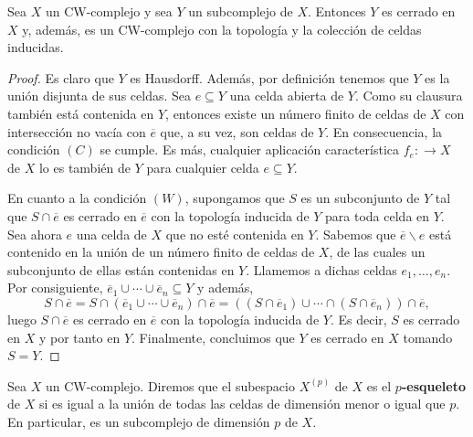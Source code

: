\begin{teorema}
	Sea $X$ un CW-complejo y sea $Y$ un subcomplejo de $X$. Entonces $Y$ es
	cerrado en $X$ y, además, es un CW-complejo con la topología y la colección de
	celdas inducidas.
\end{teorema}
\begin{proof}
	Es claro que $Y$ es Hausdorff. Además, por definición tenemos que $Y$ es la unión
	disjunta de sus celdas. Sea $e \subseteq Y$ una celda abierta de $Y$. Como su clausura
	también está contenida en $Y$, entonces existe un número finito de celdas de
	$X$ con intersección no vacía con $\overline{e}$ que, a su vez, son celdas de
	$Y$. En consecuencia, la condición $(C)$ se cumple. Es más, cualquier
	aplicación característica $f_{e} : \to X$ de $X$ lo es también de $Y$ para
	cualquier celda $e \subseteq Y$.
	
	En cuanto a la condición $(W)$, supongamos que $S$ es un subconjunto de $Y$ tal
	que $S \cap \overline{e}$ es cerrado en $\overline{e}$ con la topología inducida de $Y$ para toda celda en $Y$.
	Sea ahora $e$ una celda de $X$ que no esté contenida en $Y$. Sabemos que $\overline
	{e}\backslash e$ está contenido en la unión de un número finito de celdas de $X$,
	de las cuales un subconjunto de ellas están contenidas en $Y$. Llamemos a dichas
	celdas $e_{1}, \ldots, e_{n}$. Por consiguiente, $\overline{e}_{1} \cup \cdots
	\cup \overline{e}_{n} \subseteq Y$ y además,
	\[
	S \cap \overline{e}= S \cap (\overline{e}_{1} \cup \cdots \cup \overline{e}_{n}
	) \cap \overline{e}= \left( (S \cap \overline{e}_{1}) \cup \cdots \cap (S \cap
	\overline{e}_{n}) \right) \cap \overline{e},
	\]
	luego $S \cap \overline{e}$ es cerrado en $\overline{e}$ con la topología inducida de $Y$. Es decir, $S$ es
	cerrado en $X$ y por tanto en $Y$. Finalmente, concluimos que $Y$ es cerrado
	en $X$ tomando $S = Y$.
\end{proof}

\begin{definicion}
	Sea $X$ un CW-complejo. Diremos que el subespacio $X^{(p)}$ de $X$ es el
	\textbf{$p$-esqueleto} de $X$ si es igual a la unión de todas las celdas de dimensión
	menor o igual que $p$. En particular, es un subcomplejo de dimensión $p$ de $X$.
\end{definicion}


